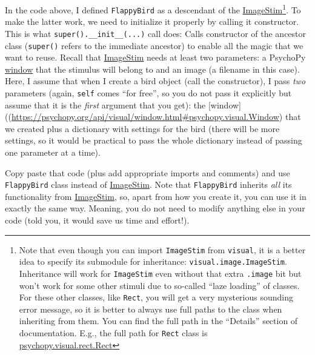 \documentclass[
]{book}
\begin{document}
In the code above, I defined \texttt{FlappyBird} as a descendant of the \href{https://psychopy.org/api/visual/imagestim.html\#psychopy.visual.ImageStim}{ImageStim}\footnote{Note that even though you can import \texttt{ImageStim} from \texttt{visual}, it is a better idea to specify its submodule for inheritance: \texttt{visual.image.ImageStim}. Inheritance will work for \texttt{ImageStim} even without that extra \texttt{.image} bit but won't work for some other stimuli due to so-called ``laze loading'' of classes. For these other classes, like \texttt{Rect}, you will get a very mysterious sounding error message, so it is better to always use full paths to the class when inheriting from them. You can find the full path in the ``Details'' section of documentation. E.g., the full path for \texttt{Rect} class is \href{https://psychopy.org/api/visual/rect.html\#details}{psychopy.visual.rect.Rect}}. To make the latter work, we need to initialize it properly by calling it constructor. This is what \texttt{super().\_\_init\_\_(...)} call does: Calls constructor of the ancestor class (\texttt{super()} refers to the immediate ancestor) to enable all the magic that we want to reuse. Recall that \href{https://psychopy.org/api/visual/imagestim.html\#psychopy.visual.ImageStim}{ImageStim} needs at least two parameters: a PsychoPy \href{(https://psychopy.org/api/visual/window.html\#psychopy.visual.Window)}{window} that the stimulus will belong to and an image (a filename in this case). Here, I assume that when I create a bird object (call the constructor), I pass \emph{two} parameters (again, \texttt{self} comes ``for free'', so you do not pass it explicitly but assume that it is the \emph{first} argument that you get): the {[}window{]}((\url{https://psychopy.org/api/visual/window.html\#psychopy.visual.Window}) that we created plus a dictionary with settings for the bird (there will be more settings, so it would be practical to pass the whole dictionary instead of passing one parameter at a time).

Copy paste that code (plus add appropriate imports and comments) and use \texttt{FlappyBird} class instead of \href{https://psychopy.org/api/visual/imagestim.html\#psychopy.visual.ImageStim}{ImageStim}. Note that \texttt{FlappyBird} inherits \emph{all} its functionality from \href{https://psychopy.org/api/visual/imagestim.html\#psychopy.visual.ImageStim}{ImageStim}, so, apart from how you create it, you can use it in exactly the same way. Meaning, you do not need to modify anything else in your code (told you, it would save us time and effort!).
\end{document}
